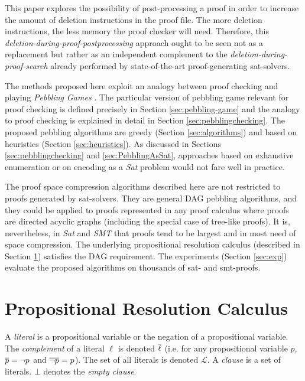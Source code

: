\documentclass{llncs}
\begin{document}
This paper explores the possibility of post-processing a proof in order to increase the amount of deletion instructions in the proof file. The more deletion instructions, the less memory the proof checker will need. Therefore, this \emph{deletion-during-proof-postprocessing} approach ought to be seen not as a replacement but rather as an independent complement to the \emph{deletion-during-proof-search} already performed by state-of-the-art proof-generating sat-solvers.

The methods proposed here exploit an analogy between proof checking and 
playing \emph{Pebbling Games} \cite{kasai1979classes,gilbert1980pebbling}. 
The particular version of pebbling game relevant for proof checking is defined precisely in Section \ref{sec:pebbling-game} and the analogy to proof checking is explained in detail in Section \ref{sec:pebblingchecking}. The proposed pebbling algorithms are greedy (Section \ref{sec:algorithms}) and based on heuristics (Section \ref{sec:heuristics}). As discussed in Sections \ref{sec:pebblingchecking} and \ref{sec:PebblingAsSat}, approaches based on exhaustive enumeration or on encoding as a \emph{Sat} problem would not fare well in practice.

The proof space compression algorithms described here are not restricted to proofs generated by sat-solvers. They are general DAG pebbling algorithms, and they could be applied to proofs represented in any proof calculus where proofs are directed acyclic graphs (including the special case of tree-like proofs). It is, nevertheless, in \emph{Sat} and \emph{SMT} that proofs tend to be largest and in most need of space compression. The underlying propositional resolution calculus (described in Section \ref{sec:Resolution}) satisfies the DAG requirement. The experiments (Section \ref{sec:exp}) evaluate the proposed algorithms on thousands of sat- and smt-proofs.


\section{Propositional Resolution Calculus}
\label{sec:Resolution}

A \emph{literal} is a propositional variable or the negation of a propositional variable. The
\emph{complement} of a literal $\ell$ is denoted $\overline{\ell}$ (i.e. for any propositional variable $p$,
$\overline{p} = \neg p$ and $\overline{\neg p} = p$). The set of all literals is denoted $\mathcal{L}$. A
\emph{clause} is a set of literals. $\bot$ denotes the \emph{empty clause}.
\end{document}
